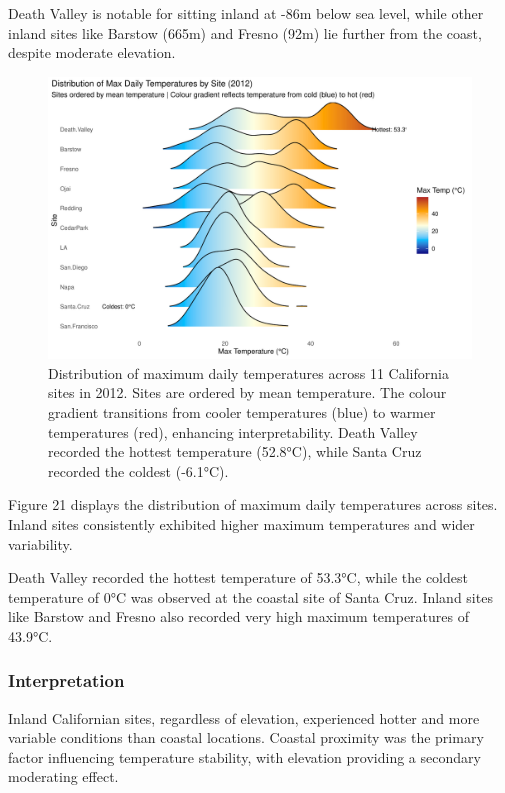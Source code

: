\documentclass[
  11pt,
]{article}
\begin{document}
Death Valley is notable for sitting inland at -86m below sea level,
while other inland sites like Barstow (665m) and Fresno (92m) lie
further from the coast, despite moderate elevation.

\begin{figure}[H]

{\centering \includegraphics{project_files/figure-pdf/ca_temp_ridgeline-1.pdf}

}

\caption{Distribution of maximum daily temperatures across 11 California
sites in 2012. Sites are ordered by mean temperature. The colour
gradient transitions from cooler temperatures (blue) to warmer
temperatures (red), enhancing interpretability. Death Valley recorded
the hottest temperature (52.8°C), while Santa Cruz recorded the coldest
(-6.1°C).}

\end{figure}%

Figure 21 displays the distribution of maximum daily temperatures across
sites. Inland sites consistently exhibited higher maximum temperatures
and wider variability.

Death Valley recorded the hottest temperature of 53.3°C, while the
coldest temperature of 0°C was observed at the coastal site of Santa
Cruz. Inland sites like Barstow and Fresno also recorded very high
maximum temperatures of 43.9°C.

\subsubsection{Interpretation}\label{interpretation-1}

Inland Californian sites, regardless of elevation, experienced hotter
and more variable conditions than coastal locations. Coastal proximity
was the primary factor influencing temperature stability, with elevation
providing a secondary moderating effect.
\end{document}
